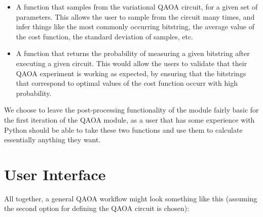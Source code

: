 \documentclass{article}
\begin{document}
\begin{itemize}
	\item A function that samples from the variational QAOA circuit, for 
		a given set of parameters. This allows the user to sample from the 
		circuit many times, and infer things like the most commonly occurring 
		bitstring, the average value of the cost function, the standard deviation 
		of samples, etc.
	\item A function that returns the probability of measuring a given bitstring after executing 
		a given circuit. This would allow the users to validate that their QAOA experiment is working
		as expected, by ensuring that the bitstrings that correspond to optimal values of the cost 
		function occurr with high probability.
\end{itemize}

We choose to leave the post-processing functionality of the module fairly basic for the 
first iteration of the QAOA module, 
as a user that has some experience with Python should be able to take these two functions 
and use them to calculate essentially anything they want.

\section{User Interface}

All together, a general QAOA workflow might look something like this (assuming the second 
option for defining the QAOA circuit is chosen):
\end{document}
